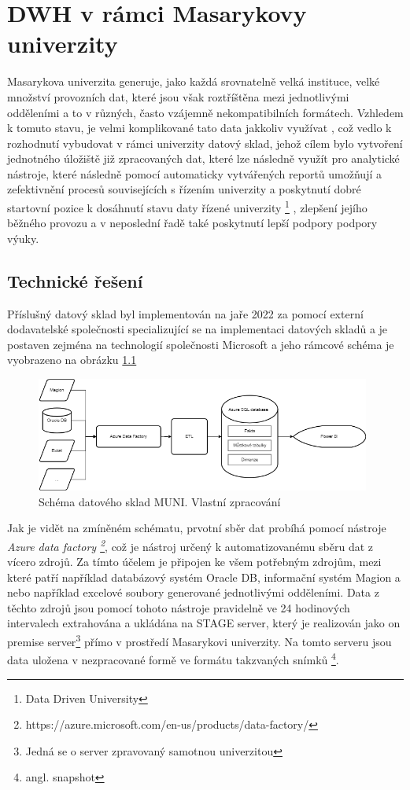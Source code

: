 \documentclass[
  digital,     %
  twoside,     %
  lof,         %
  lot,         %
]{fithesis4}
\begin{document}
\chapter{DWH v rámci Masarykovy univerzity}
Masarykova univerzita generuje, jako každá srovnatelně velká instituce, velké množství provozních dat, které jsou však roztříštěna mezi jednotlivými odděleními a to v různých, často vzájemně nekompatibilních formátech. Vzhledem k tomuto stavu, je velmi komplikované tato data jakkoliv využívat , což vedlo k rozhodnutí  vybudovat v rámci univerzity datový sklad, jehož cílem bylo vytvoření jednotného úložiště již zpracovaných dat,  které lze následně využít pro analytické nástroje, které následně pomocí automaticky vytvářených reportů umožňují a zefektivnění  procesů souvisejících s řízením univerzity a poskytnutí dobré startovní pozice k dosáhnutí stavu daty řízené univerzity \footnote{Data Driven University} , zlepšení jejího běžného provozu a v neposlední řadě také poskytnutí lepší podpory podpory výuky.

\section{Technické řešení}
Příslušný datový sklad byl implementován na jaře 2022 za pomocí externí dodavatelské společnosti specializující se na implementaci datových skladů  a je postaven zejména na technologií společnosti Microsoft a jeho rámcové schéma je vyobrazeno na obrázku \ref{fig:dwh_muni}

    \begin{figure}[t]
        \begin{center}
            \includegraphics[width=11cm]{img/dwh_muni.png}
        \end{center}
        \caption{Schéma datového sklad MUNI. Vlastní zpracování}
        \label{fig:dwh_muni}
    \end{figure} 

Jak je vidět na zmíněném schématu, prvotní sběr dat probíhá pomocí nástroje \emph{Azure data factory \footnote{https://azure.microsoft.com/en-us/products/data-factory/}}, což je nástroj určený k automatizovanému sběru dat z vícero zdrojů. Za tímto účelem je připojen ke všem potřebným zdrojům, mezi které patří například databázový systém Oracle DB, informační systém Magion a nebo například excelové soubory generované jednotlivými odděleními. Data z těchto zdrojů jsou pomocí tohoto nástroje pravidelně ve 24 hodinových intervalech extrahována a ukládána na STAGE server, který je realizován jako on premise server\footnote{Jedná se o server zpravovaný samotnou univerzitou} přímo v prostředí Masarykovi univerzity. Na tomto serveru jsou data uložena v nezpracované formě ve formátu takzvaných snímků \footnote{angl. snapshot}.
\end{document}
